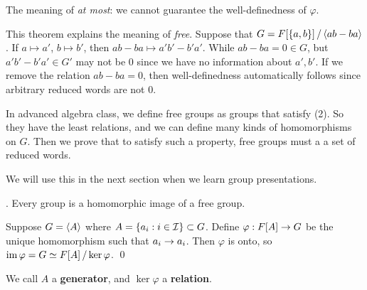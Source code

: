 The meaning of \textit{at most}: we cannot guarantee the well-definedness of \(\varphi\).

This theorem explains the meaning of \textit{free}. Suppose that \(G = F[\{a, b\}] \operatorname{/} \left\langle ab - ba \right\rangle\). If \(a \mapsto a'\), \(b \mapsto b'\), then \(ab-ba \mapsto a'b' - b'a'\). While \(ab - ba = 0 \in G\), but \(a'b' - b'a' \in G'\) may not be \(0\) since we have no information about \(a', b'\). If we remove the relation \(ab - ba = 0\), then well-definedness automatically follows since arbitrary reduced words are not \(0\).

In advanced algebra class, we define free groups as groups that satisfy (2). So they have the least relations, and we can define many kinds of homomorphisms on \(G\). Then we prove that to satisfy such a property, free groups must a a set of reduced words.

We will use this in the next section when we learn group presentations.

\thm. Every group is a homomorphic image of a free group.

\pf Suppose \(G = \left\langle A \right\rangle\) where \(A = \{a_i : i \in \mathcal{I}\} \subset G\). Define \(\varphi : F[A] \rightarrow G\) be the unique homomorphism such that \(a_i \rightarrow a_i\). Then \(\varphi\) is onto, so \(\operatorname{im} \varphi = G \simeq F[A] \operatorname{/} \ker \varphi\). \qed

We call \(A\) a \textbf{generator}, and \(\ker \varphi\) a \textbf{relation}.


\pagebreak